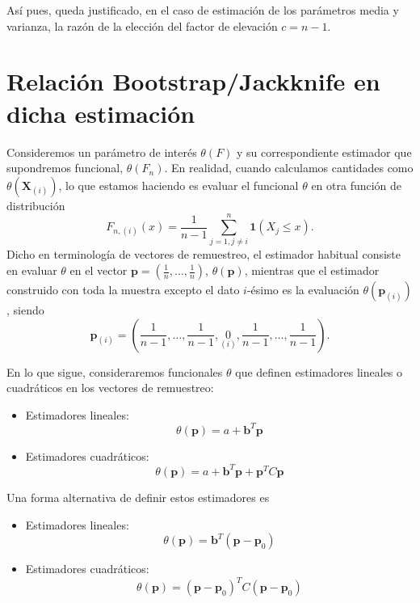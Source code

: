 \documentclass[]{book}
\theoremstyle{definition}
\theoremstyle{definition}
\theoremstyle{definition}
\theoremstyle{remark}
\begin{document}
Así pues, queda justificado, en el caso de estimación de los parámetros
media y varianza, la razón de la elección del factor de elevación
\(c=n-1\).

\section{Relación Bootstrap/Jackknife en dicha
estimación}\label{relacion-bootstrapjackknife-en-dicha-estimacion}

Consideremos un parámetro de interés \(\theta \left( F \right)\) y su
correspondiente estimador que supondremos funcional,
\(\theta \left( F_n \right)\). En realidad, cuando calculamos cantidades
como \(\theta \left( \mathbf{X}_{(i)} \right)\), lo que estamos haciendo
es evaluar el funcional \(\theta\) en otra función de
distribución\[F_{n,(i)}\left( x \right) =\frac{1}{n-1}\sum_{j=1,j\neq i}^{n}
\mathbf{1}\left( X_j\leq x \right).\]Dicho en terminología de vectores
de remuestreo, el estimador habitual consiste en evaluar \(\theta\) en
el vector \(\mathbf{p}=\left( \frac{1}{n},\ldots ,\frac{1}{n} \right)\),
\(\theta \left( \mathbf{p} \right)\), mientras que el estimador
construido con toda la muestra excepto el dato \(i\)-ésimo es la
evaluación \(\theta \left( \mathbf{p}_{(i)} \right)\), siendo
\[\mathbf{p}_{(i)}=\left( \frac{1}{n-1},\ldots ,\frac{1}{n-1},
\underset{(i)}{0},\frac{1}{n-1},\ldots ,\frac{1}{n-1} \right).\]

En lo que sigue, consideraremos funcionales \(\theta\) que definen
estimadores lineales o cuadráticos en los vectores de remuestreo:

\begin{itemize}
\item
  Estimadores lineales:
  \[\theta \left( \mathbf{p} \right) = a+\mathbf{b}^{T} \mathbf{p}\]
\item
  Estimadores cuadráticos:
  \[\theta \left( \mathbf{p} \right) = a+\mathbf{b}^{T}
  \mathbf{p}+\mathbf{p}^{T}C\mathbf{p}\]
\end{itemize}

Una forma alternativa de definir estos estimadores es

\begin{itemize}
\item
  Estimadores lineales:
  \[\theta \left( \mathbf{p} \right) = \mathbf{b}^{T}
  \left( \mathbf{p}-\mathbf{p}_{0} \right) \]
\item
  Estimadores cuadráticos:
  \[\theta \left( \mathbf{p} \right) = \left( \mathbf{p}-\mathbf{p}_{0} \right)^{T}
  C\left( \mathbf{p}-\mathbf{p}_{0} \right)\]
\end{itemize}
\end{document}
